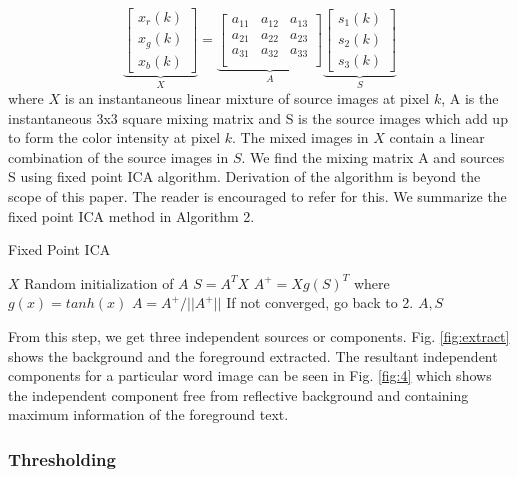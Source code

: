 \begin{equation}
\underbrace{\left[ {\begin{array}{c}
{x_r(k)} \\
{x_g(k)} \\
{x_b(k)}
 \end{array} } \right]}_{X}
=
\underbrace{\left[ {\begin{array}{ccc}
a_{11} & a_{12} & a_{13} \\
a_{21} & a_{22} & a_{23} \\
a_{31} & a_{32} & a_{33} \\
 \end{array} } \right]}_{A}
\underbrace{\left[ {\begin{array}{c}
s_1(k)\\s_2(k)\\ s_3(k)
 \end{array} } \right]}_{S}
\end{equation} where $X$ is an instantaneous linear mixture of source
images at pixel $k$, A is the instantaneous $3$x$3$ square mixing matrix and S
is the source images which add up to form the color intensity 
at pixel $k$.  
The mixed images
in $X$ contain a linear combination of the source
images in $S$. We find the mixing matrix A and sources S using fixed point ICA
algorithm.
Derivation of the algorithm is beyond the scope of this paper.
The reader is encouraged to refer \cite{A11} for this. We summarize the 
fixed point ICA method in Algorithm 2.

\begin{algorithm}[t]
\caption{Fixed Point ICA}
\begin{algorithmic}[1] 
\REQUIRE $X$
\STATE Random initialization of $A$
\STATE $S=A^TX$
\STATE $A^+=Xg(S)^T$
where $g(x)=tanh(x)$ 
\STATE $A=A^+/||A^+||$  
\STATE If not converged, go back to 2.
\ENSURE $A,S$ 
\end{algorithmic}
\end{algorithm} 
From this step, we get three independent sources or components.
Fig. \ref{fig:extract} shows the background and the foreground extracted.
The resultant independent components for a particular word image can be seen in 
Fig. \ref{fig:4} which shows the independent component free from reflective background 
and containing maximum information of the foreground text.

\subsubsection{Thresholding}

